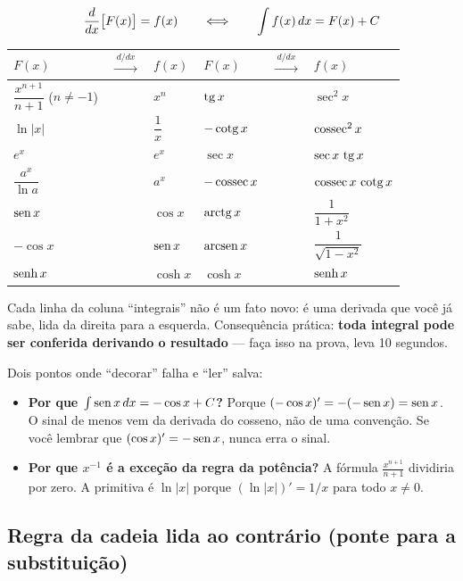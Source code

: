 \begin{definicao}
\[
\frac{d}{dx}\big[F(x)\big] = f(x)
\qquad\Longleftrightarrow\qquad
\int f(x)\,dx = F(x) + C
\]
\small
\renewcommand{\arraystretch}{1.55}
\begin{tabular}{@{}lcl@{\qquad}lcl@{}}
\toprule
$F(x)$ & $\xrightarrow{\;d/dx\;}$ & $f(x)$ & $F(x)$ & $\xrightarrow{\;d/dx\;}$ & $f(x)$\\
\midrule
$\dfrac{x^{n+1}}{n+1}$ ($n\neq -1$) & & $x^n$ & $\operatorname{tg} x$ & & $\sec^2 x$\\[6pt]
$\ln|x|$ & & $\dfrac1x$ & $-\operatorname{cotg} x$ & & $\operatorname{cossec}^2 x$\\[6pt]
$e^x$ & & $e^x$ & $\sec x$ & & $\sec x\,\operatorname{tg} x$\\[4pt]
$\dfrac{a^x}{\ln a}$ & & $a^x$ & $-\operatorname{cossec} x$ & & $\operatorname{cossec} x\,\operatorname{cotg} x$\\[6pt]
$\operatorname{sen} x$ & & $\cos x$ & $\operatorname{arctg} x$ & & $\dfrac{1}{1+x^2}$\\[6pt]
$-\cos x$ & & $\operatorname{sen} x$ & $\operatorname{arcsen} x$ & & $\dfrac{1}{\sqrt{1-x^2}}$\\[6pt]
$\operatorname{senh} x$ & & $\cosh x$ & $\cosh x$ & & $\operatorname{senh} x$\\
\bottomrule
\end{tabular}

\smallskip
Cada linha da coluna ``integrais'' não é um fato novo: é uma derivada que você já sabe, lida da direita para a esquerda. Consequência prática: \textbf{toda integral pode ser conferida derivando o resultado} --- faça isso na prova, leva 10 segundos.
\end{definicao}

Dois pontos onde ``decorar'' falha e ``ler'' salva:

\begin{itemize}[leftmargin=1.4em, itemsep=2pt]
\item \textbf{Por que $\int \operatorname{sen} x\,dx = -\cos x + C$?} Porque $(-\cos x)' = -(-\operatorname{sen} x) = \operatorname{sen} x$. O sinal de menos vem da derivada do cosseno, não de uma convenção. Se você lembrar que $(\cos x)'=-\operatorname{sen} x$, nunca erra o sinal.
\item \textbf{Por que $x^{-1}$ é a exceção da regra da potência?} A fórmula $\frac{x^{n+1}}{n+1}$ dividiria por zero. A primitiva é $\ln|x|$ porque $(\ln|x|)' = 1/x$ para todo $x\neq 0$.
\end{itemize}

\subsection{Regra da cadeia lida ao contrário (ponte para a substituição)}

